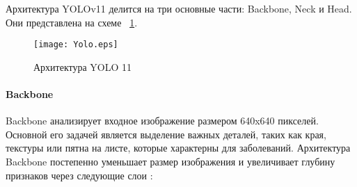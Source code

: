 Архитектура YOLOv11 делится на три основные части: Backbone, Neck и Head. Они представлена на схеме ~\ref{йоло:image}.
\begin{landscape}
	\begin{figure}[p]
		\texttt{[image: Yolo.eps]}
		\caption{Архитектура YOLO 11}
		\label{йоло:image}
	\end{figure}
\end{landscape}
\paragraph{Backbone}

Backbone анализирует входное изображение размером 640x640 пикселей. Основной его задачей является выделение важных деталей, таких как края, текстуры или пятна на листе, которые характерны для заболеваний. Архитектура Backbone постепенно уменьшает размер изображения и увеличивает глубину признаков через следующие слои \cite{yolo8}:

